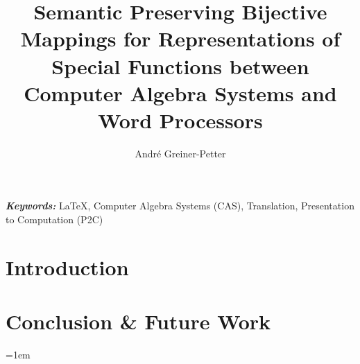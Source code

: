 \documentclass[a4paper,11pt]{article}
\title{
    Semantic Preserving Bijective Mappings for Representations of Special Functions between Computer Algebra Systems and Word Processors
}
\author{Andr\'e Greiner-Petter}
\affil{
	Information Science Group, University of Konstanz, Germany\\
	\url{andre.greiner-petter@t-online.de}
}
\date{} %
\begin{document}
\maketitle

\glsresetall

\noindent
{\it \bf Keywords:} LaTeX, Computer Algebra Systems (CAS), Translation, Presentation to Computation (P2C)



\section{Introduction}


%

%
%

%
%
%
%







%

\section{Conclusion \& Future Work}\label{ch:conc-future-work}

%

\emergencystretch=1em
\printbibliography
\end{document}
